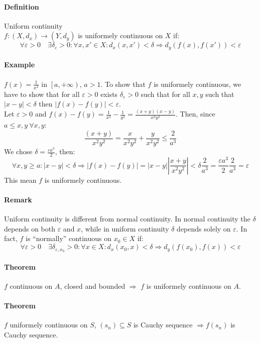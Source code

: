 \documentclass{article}
\newcommand{\abs}[1]{\left|#1\right|}
\newcommand{\func}[3]{#1 : #2 \rightarrow #3}
\newcommand{\Ep}{\varepsilon}
\newcommand{\Def}{\paragraph{Definition}}
\newcommand{\Theorem}{\paragraph{Theorem}}
\newcommand{\Remark}{\paragraph{Remark}}
\newcommand{\Example}{\paragraph{Example}}
\begin{document}
	\Def Uniform continuity
\\$\func{f}{(X,d_x)}{(Y,d_y)}$ is uniformely continuous on $X$ if:
\begin{equation*}
	\forall \Ep > 0 \quad \exists \delta_\Ep > 0 : \forall x,x' \in X : d_x(x,x')
	< \delta \Rightarrow d_y(f(x),f(x')) < \Ep
\end{equation*}

	\Example $f(x) = \frac{1}{x^2}$ in $\left[a, +\infty\right)$, $a > 1$. To show
	that $f$ is uniformely continuous, we have to show that for all $\Ep > 0$
	exists $\delta_\Ep > 0$ such that for all $x,y$ such that $\abs{x-y} < \delta$
	then $\abs{f(x)-f(y)} < \Ep$.
\\Let $\Ep > 0$ and $f(x) - f(y) = \frac{1}{x^2} - \frac{1}{y^2} =
	\frac{(x+y)(x-y)}{x^2 y^2}$. Then, since $a \leq x,y \ \forall x,y$:
\begin{equation*}
	\frac{(x+y)}{x^2 y^2} = \frac{x}{x^2 y^2} + \frac{y}{x^2 y^2} \leq \frac{2}{a^3}
\end{equation*}
	We chose $\delta = \frac{\Ep a^3}{2}$, then:
\begin{equation*}
	\forall x,y \geq a : \abs{x-y} < \delta \Rightarrow \abs{f(x)-f(y)} =
	\abs{x-y} \abs{\frac{x+y}{x^2 y^2}} < \delta \frac{2}{a^3} =
	\frac{\Ep a^3}{2} \frac{2}{a^3} = \Ep
\end{equation*}
	This mean $f$ is uniformely continuous.

	\Remark Uniform continuity is different from normal continuity. In normal
	continuity the $\delta$ depends on both $\Ep$ and $x$, while in uniform
	continuity $\delta$ depends solely on $\Ep$. In fact, $f$ is ``normally''
	continuous on $x_0 \in X$ if:
\begin{equation*}
	\forall \Ep > 0 \quad \exists \delta_{\Ep,x_0} > 0 : \forall x \in X :
	d_x(x_0,x) < \delta \Rightarrow d_y(f(x_0),f(x)) < \Ep
\end{equation*}

	\Theorem $f$ continuous on $A$, closed and bounded $\Rightarrow$ $f$ is
	uniformely continuous on $A$.

	\Theorem $f$ uniformely continuous on $S$, $(s_n) \subseteq S$ is Cauchy
	sequence $\Rightarrow f(s_n)$ is Cauchy sequence.
\end{document}
